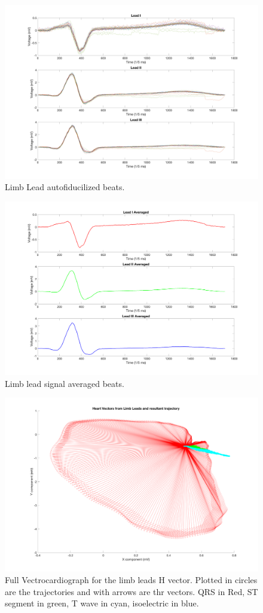 \documentclass[12pt]{article}
\begin{document}
\begin{figure}[H]
	
	\centering
	\includegraphics[width = .8\textwidth]{Figures/LimLeads2.png}
	\caption{Limb Lead autofiducilized beats.}
	\label{fig:Limb2}
\end{figure}

\begin{figure}[H]
	
	\centering
	\includegraphics[width = .8\textwidth]{Figures/LimLeads3.png}
	\caption{Limb lead signal averaged beats.}
	\label{fig:Limb3}
\end{figure}

\begin{figure}[H]
	
	\centering
	\includegraphics[width = .8\textwidth]{Figures/LimLeads4.png}
	\caption{Full Vectrocardiograph for the limb leads H vector. Plotted in circles are the trajectories and with arrows are thr vectors. QRS in Red, ST segment in green, T wave in cyan, isoelectric in blue. }
	\label{fig:Limb4}
\end{figure}
\end{document}
